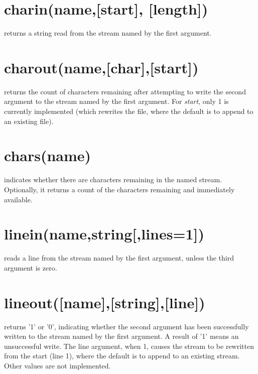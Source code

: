 \label{refrexxstream}


  
\section{charin(name,[start{]}, [length{]})} returns a string read from the stream named by the first
argument.
\section{charout(name,[char{]},[start{]})} returns the count of characters remaining after attempting to
write the second argument to the stream named by the first
argument. For \emph{start}, only 1 is currently implemented (which
rewrites the file, where the default is to append to an existing file). 
\section{chars(name)} indicates whether there are characters remaining in the named
stream. Optionally, it returns a count of the characters remaining and
immediately available.
\section{linein(name,string[,lines=1])} reads a line from the stream named by the first argument,
unless the third argument is zero.
\section{lineout([name{]},[string{]},[line{]})} returns '1' or '0', indicating whether the
  second argument has been successfully written to the stream named by
  the first argument. A result of '1' means an unsuccessful write. The
  line argument, when 1, causes the stream to be rewritten from the
  start (line 1), where the default is to append to an existing stream. Other values are not implemented. 
